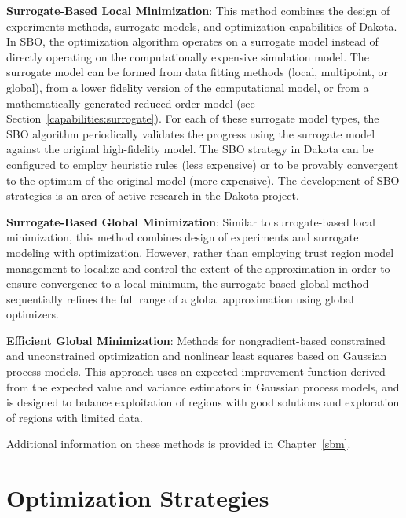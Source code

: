 \textbf{Surrogate-Based Local Minimization}: This method combines
the design of experiments methods, surrogate models, and optimization
capabilities of Dakota.
In SBO, the optimization algorithm operates on a surrogate model
instead of directly operating on the computationally expensive
simulation model.  The surrogate model can be formed from data fitting
methods (local, multipoint, or global), from a lower fidelity version
of the computational model, or from a mathematically-generated
reduced-order model (see Section~\ref{capabilities:surrogate}). For
each of these surrogate model types, the SBO algorithm periodically
validates the progress using the surrogate model against the original
high-fidelity model.  The SBO strategy in Dakota can be configured to
employ heuristic rules (less expensive) or to be provably convergent
to the optimum of the original model (more expensive). The development
of SBO strategies is an area of active research in the Dakota project.

\textbf{Surrogate-Based Global Minimization}: Similar to surrogate-based
local minimization, this method combines design of experiments and
surrogate modeling with optimization.  However, rather than employing
trust region model management to localize and control the extent of
the approximation in order to ensure convergence to a local minimum,
the surrogate-based global method sequentially refines the full range
of a global approximation using global optimizers.

\textbf{Efficient Global Minimization}: Methods for nongradient-based
constrained and unconstrained optimization and nonlinear least squares
based on Gaussian process models.  This approach uses an expected
improvement function derived from the expected value and variance
estimators in Gaussian process models, and is designed to balance
exploitation of regions with good solutions and exploration of regions
with limited data.~\cite{Jon98}

Additional information on these methods is provided in Chapter~\ref{sbm}.

\section{Optimization Strategies}\label{capabilities:optimization2}

